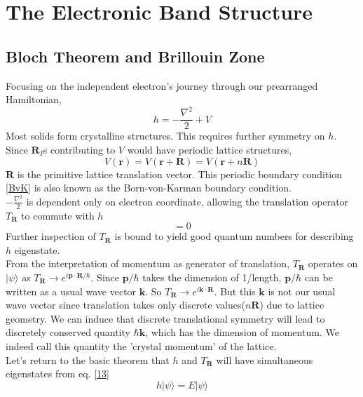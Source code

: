 \documentclass{article}
\begin{document}
\section*{The Electronic Band Structure}
\subsection*{Bloch Theorem and Brillouin Zone}
Focusing on the independent electron's journey through our prearranged Hamiltonian,
\begin{equation}
	h=-\frac{\nabla^{2}}{2}+V\label{singleelctronHamiltonian}
\end{equation}
Most solids form crystalline structures. This requires further symmetry on $h$. Since $\mathbf{R}_{I}$s contributing to $V$ would have periodic lattice structures,
\begin{equation}
	V(\mathbf{r})=V(\mathbf{r}+\mathbf{R})=V(\mathbf{r}+n\mathbf{R})\label{BvK}
\end{equation}
$\mathbf{R}$ is the primitive lattice translation vector. This periodic boundary condition \eqref{BvK} is also known as the Born-von-Karman boundary condition.\\
$-\frac{\nabla^{2}}{2}$ is dependent only on electron coordinate, allowing the translation operator $T_{\mathbf{R}}$ to commute with $h$
\begin{equation}
	[h,T_{\mathbf{R}}]=0\label{13}
\end{equation}
Further inspection of $T_\mathbf{R}$ is bound to yield good quantum numbers for describing $h$ eigenstate.\\
From the interpretation of momentum as generator of translation, $T_\mathbf{R}$ operates on $|\psi\rangle$ as $T_{\mathbf{R}}\to e^{i\mathbf{p}\cdot\mathbf{R}/\hbar}$. Since $\mathbf{p}/\hbar$ takes the dimension of 1/length, $\mathbf{p}/\hbar$ can be written as a usual wave vector $\mathbf{k}$. So $T_{\mathbf{R}}\to e^{i\mathbf{k}\cdot\mathbf{R}}$.
But this $\mathbf{k}$ is not our usual wave vector since translation takes only discrete values($n\mathbf{R}$) due to lattice geometry. We can induce that discrete translational symmetry will lead to discretely conserved quantity $\hbar\mathbf{k}$, which has the dimension of momentum. We indeed call this quantity the 'crystal momentum' of the lattice.\\
Let's return to the basic theorem that $h$ and $T_{\mathbf{R}}$ will have simultaneous eigenstates from eq. \eqref{13}
\begin{equation}
	h|\psi\rangle=E|\psi\rangle
\end{equation}
\end{document}
